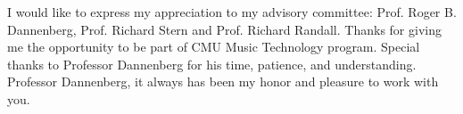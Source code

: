 
\begin{acknowledgements}      %
I would like to express my appreciation to my advisory committee: 
Prof. Roger B. Dannenberg, Prof. Richard Stern and Prof. Richard Randall. 
Thanks for giving me the opportunity to be part of CMU Music Technology program. 
Special thanks to Professor Dannenberg for his time, patience, and understanding.
Professor Dannenberg, it always has been my honor and pleasure to work with you. 
\end{acknowledgements}
